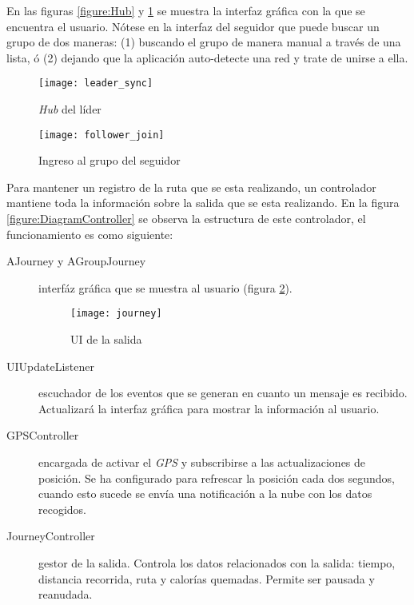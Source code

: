 En las figuras \ref{figure:Hub} y \ref{figure:FollowerJoin} se muestra la interfaz gráfica con la que se encuentra el usuario. Nótese en la interfaz del seguidor que puede buscar un grupo de dos maneras: (1) buscando el grupo de manera manual a través de una lista, ó (2) dejando que la aplicación auto-detecte una red y trate de unirse a ella.			

\begin{figure}[H]
	\begin{minipage}{.5\textwidth}
		\begin{center}
			\texttt{[image: leader\_sync]}
			\caption{\emph{Hub} del líder}
			\label{figure:Hub}
		\end{center}
	\end{minipage}
\begin{minipage}{.5\textwidth}
	\begin{center}
		\texttt{[image: follower\_join]}
		\caption{Ingreso al grupo del seguidor}
		\label{figure:FollowerJoin}
	\end{center}
\end{minipage}
\end{figure}
		
Para mantener un registro de la ruta que se esta realizando, un controlador mantiene toda la información sobre la salida que se esta realizando. En la figura \ref{figure:DiagramController} se observa la estructura de este controlador, el funcionamiento es como siguiente:
\begin{description}
	\item[AJourney y AGroupJourney] interfáz gráfica que se muestra al usuario (figura \ref{figure:Journey}).
	\begin{figure}[H]
		\begin{center}
			\texttt{[image: journey]}
			\caption{UI de la salida}
			\label{figure:Journey}
		\end{center}
	\end{figure}			
	\item[UIUpdateListener] escuchador de los eventos que se generan en cuanto un mensaje es recibido. Actualizará la interfaz gráfica para mostrar la información al usuario.
	\item[GPSController] encargada de activar el \emph{GPS} y subscribirse a las actualizaciones de posición. Se ha configurado para refrescar la posición cada dos segundos, cuando esto sucede se envía una notificación a la nube con los datos recogidos.
	\item[JourneyController] gestor de la salida. Controla los datos relacionados con la salida: tiempo, distancia recorrida, ruta y calorías quemadas. Permite ser pausada y reanudada.
\end{description}
		
